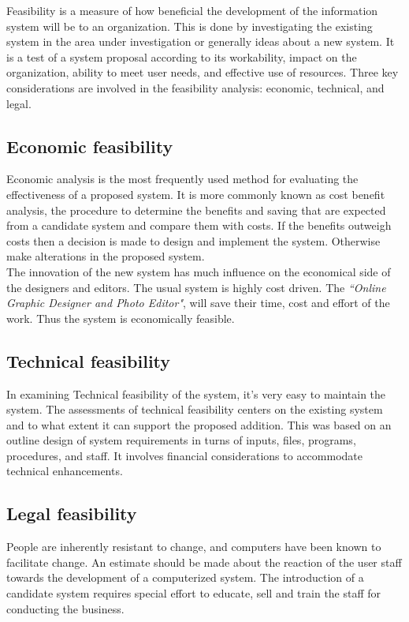 \documentclass[12pt,a4 paper]{report}
\begin{document}
Feasibility is a measure of how beneficial the development of the information system will be to an organization. This is 
done by investigating the existing system in the area under investigation or generally ideas about a new system. It is a test of a system proposal according to its workability, impact on the organization, ability to meet user needs, and effective use of resources. Three key considerations are involved in the feasibility analysis: economic, technical, and legal. \\
 
\subsection{Economic feasibility}
Economic analysis is the most frequently used method for evaluating the effectiveness of a proposed system. It is more commonly known as cost benefit analysis, the procedure to determine the benefits and saving that are expected from a candidate system and compare them with costs. If the benefits outweigh costs then a decision is made to design and implement the system. Otherwise make alterations in the proposed system. \\

The innovation of the new system has much influence on the economical side of the designers and editors. The usual system is highly cost driven. The \textit{``Online Graphic Designer and Photo Editor"}, will save their time, cost and effort of the work. Thus the system is economically feasible. \\

\subsection{Technical feasibility}
In examining Technical feasibility of the system, it's very easy to maintain the system. The assessments of technical feasibility centers on the existing system and to what extent it can support the proposed addition. This was based on an outline design of system requirements in turns of inputs, files, programs, procedures, and staff. It involves financial considerations to accommodate technical enhancements. \\

\subsection{Legal feasibility}
People are inherently resistant to change, and computers have been known to facilitate change. An estimate should be made about the reaction of the user staff towards the development of a computerized system. The introduction of a candidate system requires special effort to educate, sell and train the staff for conducting the business. \\
\end{document}
